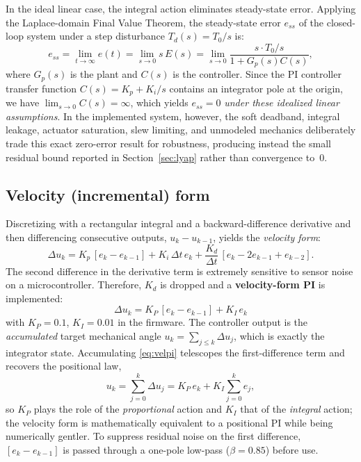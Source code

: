 \documentclass[conference]{IEEEtran}
\begin{document}
In the ideal linear case, the integral action eliminates steady-state error. Applying the Laplace-domain Final Value Theorem, the steady-state error $e_{ss}$ of the closed-loop system under a step disturbance $T_d(s) = T_0/s$ is:
\begin{equation}
  e_{ss} = \lim_{t\to\infty} e(t) = \lim_{s\to 0} s\,E(s) = \lim_{s\to 0} \frac{s \cdot T_0/s}{1 + G_p(s)C(s)},
\end{equation}
where $G_p(s)$ is the plant and $C(s)$ is the controller. Since the PI controller transfer function $C(s) = K_p + K_i/s$ contains an integrator pole at the origin, we have $\lim_{s\to 0} C(s) = \infty$, which yields $e_{ss} = 0$ \emph{under these idealized linear assumptions}. In the implemented system, however, the soft deadband, integral leakage, actuator saturation, slew limiting, and unmodeled mechanics deliberately trade this exact zero-error result for robustness, producing instead the small residual bound reported in Section~\ref{sec:lyap} rather than convergence to~$0$.

\subsection{Velocity (incremental) form}
Discretizing with a rectangular integral and a backward-difference derivative
and then differencing consecutive outputs, $u_k - u_{k-1}$, yields the
\emph{velocity form}:
\begin{equation}
  \Delta u_k = K_p\,[e_k-e_{k-1}] + K_i\,\Delta t\, e_k
  + \frac{K_d}{\Delta t}\,[e_k-2e_{k-1}+e_{k-2}].
\end{equation}
The second difference in the derivative term is extremely sensitive to sensor
noise on a microcontroller. Therefore, $K_d$ is dropped and a
\textbf{velocity-form PI} is implemented:
\begin{equation}
  \boxed{\;\Delta u_k = K_{P}\,[e_k-e_{k-1}] + K_{I}\, e_k\;}
  \label{eq:velpi}
\end{equation}
with $K_{P}=0.1$, $K_{I}=0.01$ in the firmware. The controller output is the
\emph{accumulated} target mechanical angle $u_k=\sum_{j\le k}\Delta u_j$, which
is exactly the integrator state. Accumulating \eqref{eq:velpi} telescopes the
first-difference term and recovers the positional law,
\begin{equation}
  u_k=\sum_{j=0}^{k}\Delta u_j = K_{P}\,e_k + K_{I}\sum_{j=0}^{k}e_j,
\end{equation}
so $K_{P}$ plays the role of the \emph{proportional} action and $K_{I}$ that of
the \emph{integral} action; the velocity form is mathematically equivalent to a
positional PI while being numerically gentler. To suppress residual noise on the
first difference, $[e_k-e_{k-1}]$ is passed through a one-pole low-pass
($\beta=0.85$) before use.
\end{document}
